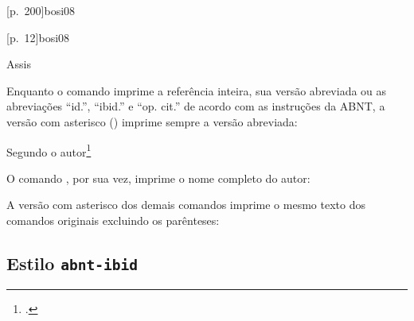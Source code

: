 \documentclass[a4paper]{article}
\begin{document}
\begin{example}
\cites{mann09}{moretti09:1, moretti09}
\end{example}

\begin{example}
[p.~200]{bosi08}
\end{example}

\begin{example}
[p.~12]{bosi08}
\end{example}

\begin{example}
\end{example}

\begin{example}
Assis \cite[apud][p.~200]{bosi08}
\end{example}


Enquanto o comando \PVerb{\footcite} imprime a referência inteira, sua versão
abreviada ou as abreviações ``id.'', ``ibid.'' e ``op. cit.'' de acordo com
as instruções da ABNT, a versão com asterisco (\PVerb{\footcite*}) imprime
sempre a versão abreviada:

\begin{example}
Segundo o autor\footcite*{assis08}
\end{example}

O comando \PVerb{\textcite*}, por sua vez, imprime o nome completo do autor:

\begin{example}
\textcite*{bosi08}
\end{example}

A versão com asterisco dos demais comandos imprime o mesmo texto dos comandos
originais excluindo os parênteses:

\begin{example}
\cite*{bosi08}
\end{example}

\begin{example}
\end{example}

\begin{example}
\citeauthor*{bosi08}
\end{example}

\begin{example}
\citeyear*{bosi08}
\end{example}


\subsection{Estilo \texttt{abnt-ibid}}%
\end{document}
